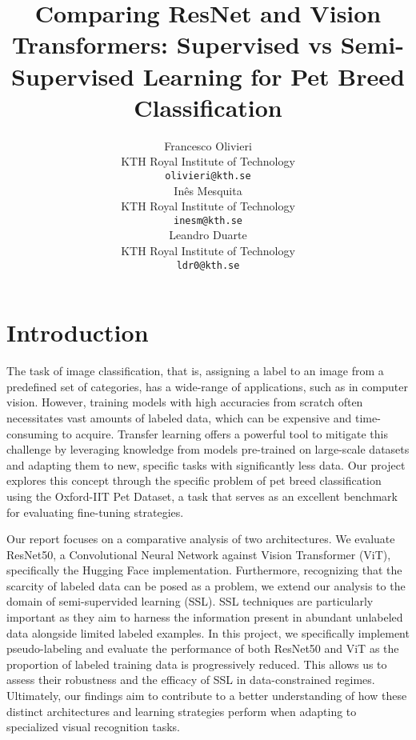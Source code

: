\documentclass{article}
\title{Comparing ResNet and Vision Transformers: Supervised vs Semi-Supervised Learning for Pet Breed Classification}
\author{%
  Francesco Olivieri \\
  KTH Royal Institute of Technology \\
  \texttt{olivieri@kth.se} \\
  \And
  Inês Mesquita \\
  KTH Royal Institute of Technology \\
  \texttt{inesm@kth.se} \\
  \And
  Leandro Duarte \\
  KTH Royal Institute of Technology \\
  \texttt{ldr0@kth.se} \\
}
\begin{document}
\maketitle

\begin{abstract}
\end{abstract}

\section{Introduction}
The task of image classification, that is, assigning a label to an image from a predefined set of categories, has a wide-range of applications, such as in computer vision. However, training models with high accuracies from scratch often necessitates vast amounts of labeled data, which can be expensive and time-consuming to acquire. Transfer learning offers a powerful tool to mitigate this challenge by leveraging knowledge from models pre-trained on large-scale datasets and adapting them to new, specific tasks with significantly less data. Our project explores this concept through the specific problem of pet breed classification using the Oxford-IIT Pet Dataset, a task that serves as an excellent benchmark for evaluating fine-tuning strategies.

Our report focuses on a comparative analysis of two architectures. We evaluate ResNet50, a Convolutional Neural Network against Vision Transformer (ViT), specifically the Hugging Face implementation. Furthermore, recognizing that the scarcity of labeled data can be posed as a problem, we extend our analysis to the domain of semi-supervided learning (SSL). SSL techniques are particularly important as they aim to harness the information present in abundant unlabeled data alongside limited labeled examples. In this project, we specifically implement pseudo-labeling and evaluate the performance of both ResNet50 and ViT as the proportion of labeled training data is progressively reduced. This allows us to assess their robustness and the efficacy of SSL in data-constrained regimes. Ultimately, our findings aim to contribute to a better understanding of how these distinct architectures and learning strategies perform when adapting to specialized visual recognition tasks.


\end{document}
